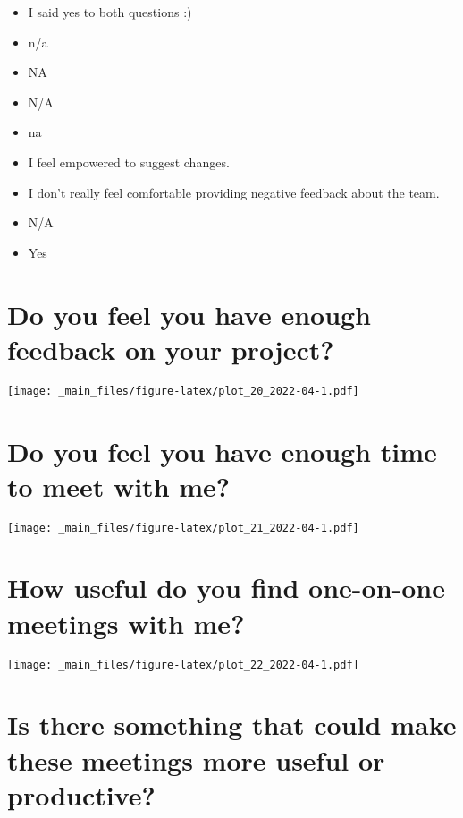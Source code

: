 \documentclass[
]{book}
\providecommand{\tightlist}{%
  \setlength{\itemsep}{0pt}\setlength{\parskip}{0pt}}
\begin{document}
\begin{itemize}
\tightlist
\item
  I said yes to both questions :)
\item
  n/a
\item
  NA
\item
  N/A
\item
  na
\item
  I feel empowered to suggest changes.
\item
  I don't really feel comfortable providing negative feedback about the team.
\item
  N/A
\item
  Yes
\end{itemize}

\hypertarget{do-you-feel-you-have-enough-feedback-on-your-project}{%
\section{Do you feel you have enough feedback on your project?}\label{do-you-feel-you-have-enough-feedback-on-your-project}}

\texttt{[image: \_main\_files/figure-latex/plot\_20\_2022-04-1.pdf]}

\hypertarget{do-you-feel-you-have-enough-time-to-meet-with-me}{%
\section{Do you feel you have enough time to meet with me?}\label{do-you-feel-you-have-enough-time-to-meet-with-me}}

\texttt{[image: \_main\_files/figure-latex/plot\_21\_2022-04-1.pdf]}

\hypertarget{how-useful-do-you-find-one-on-one-meetings-with-me}{%
\section{How useful do you find one-on-one meetings with me?}\label{how-useful-do-you-find-one-on-one-meetings-with-me}}

\texttt{[image: \_main\_files/figure-latex/plot\_22\_2022-04-1.pdf]}

\hypertarget{is-there-something-that-could-make-these-meetings-more-useful-or-productive}{%
\section{Is there something that could make these meetings more useful or productive?}\label{is-there-something-that-could-make-these-meetings-more-useful-or-productive}}
\end{document}
